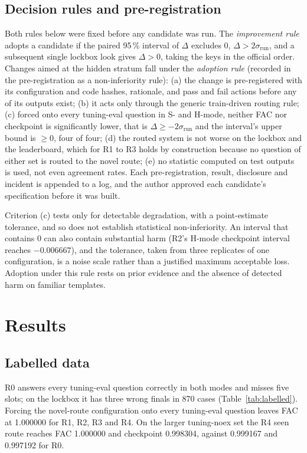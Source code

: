 \documentclass[conference]{IEEEtran}
\begin{document}
\subsection{Decision rules and pre-registration}\label{sec:rules}
Both rules below were fixed before any candidate was run. The \emph{improvement rule} adopts a candidate if the paired 95\,\% interval of $\Delta$ excludes 0, $\Delta>2\sigma_{\mathrm{run}}$, and a subsequent single lockbox look gives $\Delta>0$, taking the keys in the official order. Changes aimed at the hidden stratum fall under the \emph{adoption rule} (recorded in the pre-registration as a non-inferiority rule): (a) the change is pre-registered with its configuration and code hashes, rationale, and pass and fail actions before any of its outputs exist; (b) it acts only through the generic train-driven routing rule; (c) forced onto every tuning-eval question in S- and H-mode, neither FAC nor checkpoint is significantly lower, that is $\Delta\ge-2\sigma_{\mathrm{run}}$ and the interval's upper bound is $\ge0$, four of four; (d) the routed system is not worse on the lockbox and the leaderboard, which for R1 to R3 holds by construction because no question of either set is routed to the novel route; (e) no statistic computed on test outputs is used, not even agreement rates. Each pre-registration, result, disclosure and incident is appended to a log, and the author approved each candidate's specification before it was built.

Criterion (c) tests only for detectable degradation, with a point-estimate tolerance, and so does not establish statistical non-inferiority. An interval that contains 0 can also contain substantial harm (R2's H-mode checkpoint interval reaches $-0.006667$), and the tolerance, taken from three replicates of one configuration, is a noise scale rather than a justified maximum acceptable loss. Adoption under this rule rests on prior evidence and the absence of detected harm on familiar templates.

\section{Results}\label{sec:results}




\subsection{Labelled data}
R0 answers every tuning-eval question correctly in both modes and misses five slots; on the lockbox it has three wrong finals in 870 cases (Table~\ref{tab:labelled}). Forcing the novel-route configuration onto every tuning-eval question leaves FAC at 1.000000 for R1, R2, R3 and R4. On the larger tuning-noex set the R4 seen route reaches FAC 1.000000 and checkpoint 0.998304, against 0.999167 and 0.997192 for R0.
\end{document}
